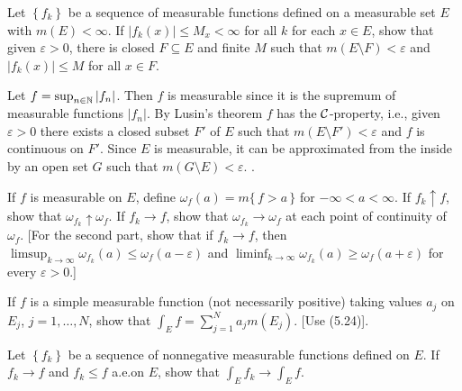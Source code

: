 \begin{problem}
  Let $\left\{f_k\right\}$ be a sequence of measurable functions defined on
  a measurable set $E$ with $m(E)<\infty$. If $|f_k(x)|\leq M_x<\infty$ for
  all $k$ for each $x\in E$, show that given $\varepsilon>0$, there is
  closed $F\subseteq E$ and finite $M$ such that
  $m(E\setminus F)<\varepsilon$ and $|f_k(x)|\leq M$ for all $x\in F$.
\end{problem}
\begin{solution}
  Let $f=\sup_{n\in\mathbb{N}}|f_n|$. Then $f$ is measurable since it is the
  supremum of measurable functions $|f_n|$. By Lusin's theorem $f$ has the
  $\mathcal{C}$-property, i.e., given $\varepsilon>0$ there exists a closed
  subset $F'$ of $E$ such that $m(E\setminus F')<\varepsilon$ and $f$ is
  continuous on $F'$. Since $E$ is measurable, it can be approximated from
  the inside by an open set $G$ such that $m(G\setminus
  E)<\varepsilon$. . %
\end{solution}

\begin{problem}
  If $f$ is measurable on $E$, define
  $\omega_f(a)=m\{\,f>a\,\}$ for $-\infty<a<\infty$. If
  $f_k\uparrow f$, show that $\omega_{f_k}\uparrow\omega_f$. If $f_k\to f$,
  show that $\omega_{f_k}\to\omega_f$ at each point of continuity of
  $\omega_f$. [For the second part, show that if $f_k\to f$, then
  $\limsup_{k\to\infty}\omega_{f_k}(a)\leq\omega_f(a-\varepsilon)$ and
  $\liminf_{k\to\infty}\omega_{f_k}(a)\geq\omega_f(a+\varepsilon)$ for
  every $\varepsilon>0$.]
\end{problem}
\begin{solution}

\end{solution}

\begin{problem}
  If $f$ is a simple measurable function (not necessarily positive) taking
  values $a_j$ on $E_j$, $j=1,\ldots,N$, show that
  $\int_E f=\sum_{j=1}^N a_jm(E_j)$. [Use (5.24)].
\end{problem}
\begin{solution}
\end{solution}

\begin{problem}
  Let $\left\{f_k\right\}$ be a sequence of nonnegative measurable
  functions defined on $E$. If $f_k\to f$ and $f_k\leq f$ a.e.\@ on $E$,
  show that $\int_E f_k\to\int_E f$.
\end{problem}
\begin{solution}
\end{solution}

